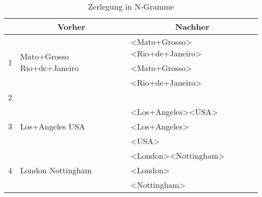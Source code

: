 					\begin{table}[h]
					\centering
					\caption{Zerlegung in N-Gramme}
					\label{tab:NGramme}
					\begin{tabular}{|l|l|l|}
					\hline 
					\multicolumn{1}{|c|}{\textbf{}} & \multicolumn{1}{c|}{\textbf{Vorher}}        & \multicolumn{1}{c|}{\textbf{Nachher}}                                                    \\ \hline \hline
					\multirow{3}{*}{1}              & \multirow{3}{*}{Mato+Grosso Rio+de+Janeiro} & \textless Mato+Grosso\textgreater\textless Rio+de+Janeiro\textgreater                     \\ \cline{3-3} 
					                                &                                             & \textless Mato+Grosso\textgreater                                                         \\ \cline{3-3} 
					                                &                                             & \textless Rio+de+Janeiro\textgreater                                                     \\ \hline \hline
					2                               &                                             &                                                                                          \\ \hline \hline
					\multirow{3}{*}{3}              & \multirow{3}{*}{Los+Angeles USA}            & \textless Los+Angeles\textgreater\textless USA\textgreater                                 \\ \cline{3-3} 
					                                &                                             & \textless Los+Angeles\textgreater                                                         \\ \cline{3-3} 
					                                &                                             & \textless USA\textgreater                                                                 \\ \hline \hline
					\multirow{3}{*}{4}              & \multirow{3}{*}{London Nottingham}          & \textless London\textgreater\textless Nottingham\textgreater                               \\ \cline{3-3} 
					                                &                                             & \textless London\textgreater                                                              \\ \cline{3-3} 
					                                &                                             & \textless Nottingham\textgreater                                                          \\ \hline \hline

\end{tabular}
\end{table}

